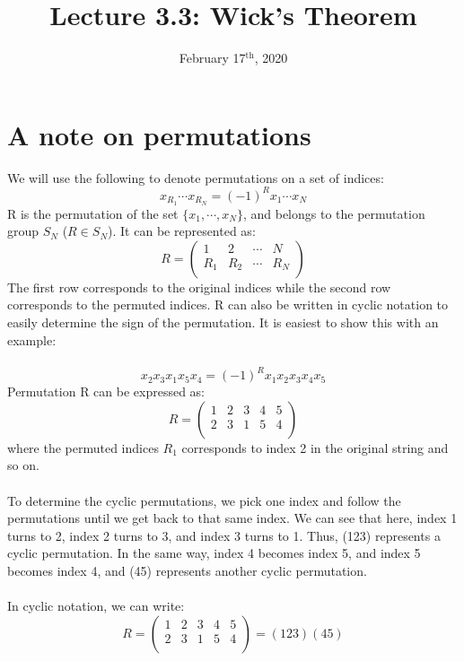 \documentclass{article}
\title{Lecture 3.3: Wick's Theorem}
\date{February 17$^{\text{th}}$, 2020}
\newcommand{\cd}{\ensuremath{\cdots} }
\begin{document}
\maketitle
\noindent
\section{A note on permutations} 
We will use the following to denote permutations on a set of indices: 
\[ x_{R_1} \cd x_{R_N} = (-1)^R x_1 \cd x_N \]
R is the permutation of the set $\{x_1, \cd, x_N\}$, and belongs to the permutation group $S_N$ ($R \in S_N$). 
It can be represented as: 
\begin{equation*}
R = 
\begin{pmatrix}
1 & 2 & \cdots & N  \\
R_1& R_2& \cdots & R_N \\
\end{pmatrix}
\end{equation*}
The first row corresponds to the original indices while the second row corresponds to the permuted indices. 
R can also be written in cyclic notation to easily determine the sign of the permutation. It is easiest to show this with an example: \\ \\
\[ x_2 x_3 x_1 x_5 x_4  = (-1)^R x_1 x_2 x_3 x_4 x_5 \]
Permutation R can be expressed as:
\begin{equation*}
R = 
\begin{pmatrix}
1 & 2 &3 & 4 & 5  \\
2 & 3 & 1 & 5 & 4 \\
\end{pmatrix}
\end{equation*}
where the permuted indices $R_1$ corresponds to index 2 in the original string and so on. \\ \\
To determine the cyclic permutations, we pick one index and follow the permutations until we get back to that same index. 
We can see that here, index 1 turns to 2, index 2 turns to 3, and index 3 turns to 1.
Thus, (123) represents a cyclic permutation. 
In the same way, index 4 becomes index 5, and index 5 becomes index 4, and (45) represents another cyclic permutation. 
\\ \\
In cyclic notation, we can write: 
\begin{equation*}
R = 
\begin{pmatrix}
1 & 2 &3 & 4 & 5  \\
2 & 3 & 1 & 5 & 4 \\
\end{pmatrix}
= (123)(45)
\end{equation*}
\end{document}

